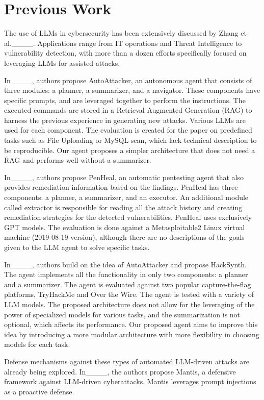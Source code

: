 \section{Previous Work}
\label{sec-previouswork}

The use of LLMs in cybersecurity has been extensively discussed by Zhang et al.____. Applications range from IT operations and Threat Intelligence to vulnerability detection, with more than a dozen efforts specifically focused on leveraging LLMs for assisted attacks.

In____, authors propose AutoAttacker, an autonomous agent that consists of three modules: a planner, a summarizer, and a navigator. These components have specific prompts, and are leveraged together to perform the instructions. The executed commands are stored in a Retrieval Augmented Generation (RAG) to harness the previous experience in generating new attacks. Various LLMs are used for each component. The evaluation is created for the paper on predefined tasks such as File Uploading or MySQL scan, which lack technical description to be reproducible. Our agent proposes a simpler architecture that does not need a RAG and performs well without a summarizer.

In____, authors propose PenHeal, an automatic pentesting agent that also provides remediation information based on the findings. PenHeal has three components: a planner, a summarizer, and an executor. An additional module called extractor is responsible for reading all the attack history and creating remediation strategies for the detected vulnerabilities. PenHeal uses exclusively GPT models. The evaluation is done against a Metasploitable2 Linux virtual machine (2019-08-19 version), although there are no descriptions of the goals given to the LLM agent to solve specific tasks.

In____, authors build on the idea of AutoAttacker and propose HackSynth. The agent implements all the functionality in only two components: a planner and a summarizer. The agent is evaluated against two popular capture-the-flag platforms, TryHackMe and Over the Wire. The agent is tested with a variety of LLM models. The proposed architecture does not allow for the leveraging of the power of specialized models for various tasks, and the summarization is not optional, which affects its performance. Our proposed agent aims to improve this idea by introducing a more modular architecture with more flexibility in choosing models for each task.

Defense mechanisms against these types of automated LLM-driven attacks are already being explored. In____, the authors propose Mantis, a defensive framework against LLM-driven cyberattacks. Mantis leverages prompt injections as a proactive defense.

